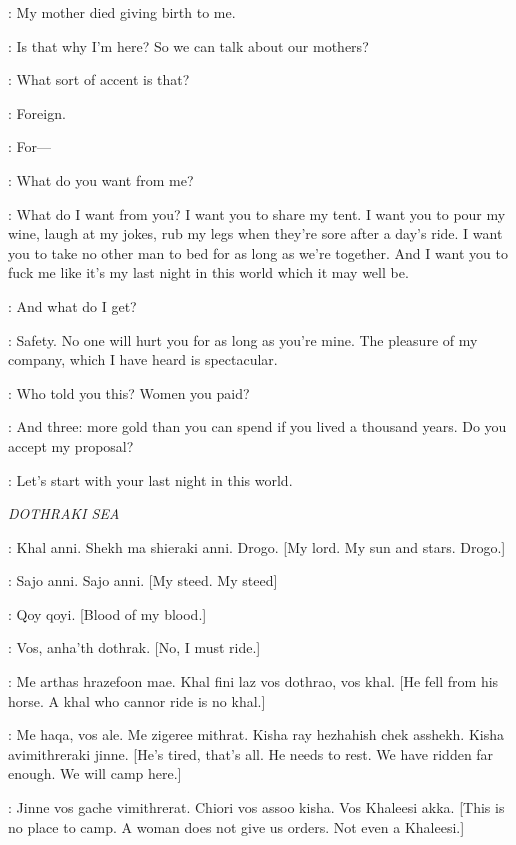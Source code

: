 \TYRION: My mother died giving birth to me. 

\SHAE: Is that why I'm here? So we can talk about our mothers? 

\TYRION: What sort of accent is that? 

\SHAE: Foreign. 

\TYRION: For---

\SHAE: What do you want from me? 

\TYRION: What do I want from you? I want you to share my tent. I want you to pour my wine, laugh at my jokes, rub my legs when they're sore after a day's ride. I want you to take no other man to bed for as long as we're together. And I want you to fuck me like it's my last night in this world which it may well be. 

\SHAE: And what do I get? 

\TYRION: Safety. No one will hurt you for as long as you're mine. The pleasure of my company, which I have heard is spectacular. 

\SHAE: Who told you this? Women you paid? 

\TYRION: And three: more gold than you can spend if you lived a thousand years. Do you accept my proposal? 

\SHAE: Let's start with your last night in this world. 


\scene

\textit{DOTHRAKI SEA} 


\DAENERYS: Khal anni. Shekh ma shieraki anni. Drogo. [My lord. My sun and stars. Drogo.] 


\DROGO: Sajo anni. Sajo anni. [My steed. My steed] 

\HAGGO: Qoy qoyi. [Blood of my blood.] 

\DROGO: Vos, anha'th dothrak. [No, I must ride.] 

\QOTHO: Me arthas hrazefoon mae. Khal fini laz vos dothrao, vos khal.  [He fell from his horse. A khal who cannor ride is no khal.] 

\DAENERYS: Me haqa, vos ale. Me zigeree mithrat. Kisha ray hezhahish chek asshekh. Kisha avimithreraki jinne. [He's tired, that's all. He needs to rest. We have ridden far enough. We will camp here.] 

\QOTHO: Jinne vos gache vimithrerat. Chiori vos assoo kisha. Vos Khaleesi akka. [This is no place to camp. A woman does not give us orders. Not even a Khaleesi.] 

